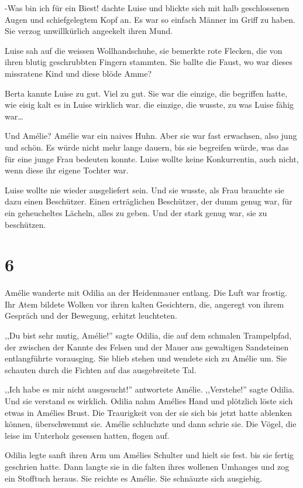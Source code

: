 -Was bin ich für ein Biest! dachte Luise und blickte sich mit halb geschlossenen Augen und schiefgelegtem Kopf an. Es war so einfach Männer im Griff zu haben. Sie verzog unwillkürlich angeekelt ihren Mund.

Luise sah auf die weissen Wollhandschuhe, sie bemerkte rote Flecken, die von ihren blutig geschrubbten Fingern stammten. Sie ballte die Faust, wo war dieses missratene Kind und diese blöde Amme?

Berta kannte Luise zu gut. Viel zu gut. Sie war die einzige, die begriffen hatte, wie eisig kalt es in Luise wirklich war. die einzige, die wusste, zu was Luise fähig war\dots

Und Amélie? Amélie war ein naives Huhn. Aber sie war fast erwachsen, also jung und schön. Es würde nicht mehr lange dauern, bis sie begreifen würde, was das für eine junge Frau bedeuten konnte. Luise wollte keine Konkurrentin, auch nicht, wenn diese ihr eigene Tochter war.

Luise wollte nie wieder ausgeliefert sein. Und sie wusste, als Frau brauchte sie dazu einen Beschützer. Einen erträglichen Beschützer, der dumm genug war, für ein geheucheltes Lächeln, alles zu geben. Und der stark genug war, sie zu beschützen.

\section*{6}



Amélie wanderte mit Odilia an der Heidenmauer entlang. Die Luft war frostig. Ihr Atem bildete Wolken vor ihren kalten Gesichtern, die, angeregt von ihrem Gespräch und der Bewegung, erhitzt leuchteten.

,,Du bist sehr mutig, Amélie!'' sagte Odilia, die auf dem schmalen Trampelpfad, der zwischen der Kannte des Felsen und der Mauer aus gewaltigen Sandsteinen entlangführte vorausging. Sie blieb stehen und wendete sich zu Amélie um. Sie schauten durch die Fichten auf das ausgebreitete Tal.

,,Ich habe es mir nicht ausgesucht!'' antwortete Amélie. ,,Verstehe!'' sagte Odilia. Und sie verstand es wirklich.
Odilia nahm Amélies Hand und plötzlich löste sich etwas in Amélies Brust. Die Traurigkeit von der sie sich bis jetzt hatte ablenken können, überschwemmt sie. Amélie schluchzte und dann schrie sie. Die Vögel, die leise im Unterholz gesessen hatten, flogen auf. 

Odilia legte sanft ihren Arm um Amélies Schulter und hielt sie fest. bis sie fertig geschrien hatte. Dann langte sie in die falten ihres wollenen Umhanges und zog ein Stofftuch heraus. Sie reichte es Amélie. Sie schnäuzte sich ausgiebig.

